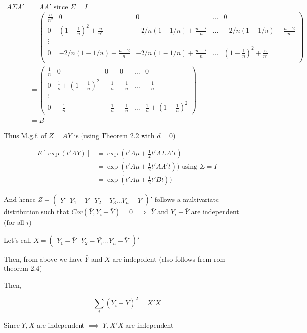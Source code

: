 \documentclass[a4paper]{article}
\begin{document}
\begin{align*}
A\Sigma A' &=  AA' \text{ since } \Sigma = I\\
&= \begin{pmatrix}
\frac{n}{n^2} & 0 & 0 & \dots & 0 \\
0 & (1-\frac{1}{n})^2+\frac{n}{n^2}  &  -2/n(1-1/n) + \frac{n-2}{n} & \dots & -2/n(1-1/n) + \frac{n-2}{n}\\
\vdots \\
0 & -2/n(1-1/n) + \frac{n-2}{n} & -2/n(1-1/n) + \frac{n-2}{n} & \dots & (1-\frac{1}{n})^2+\frac{n}{n^2}\\
\end{pmatrix}\\
&= \begin{pmatrix}
\frac{1}{n} & 0 & 0 & 0 & \dots & 0\\
0 & \frac{1}{n}+(1-\frac{1}{n})^2 & -\frac{1}{n} & -\frac{1}{n} &\dots & -\frac{1}{n}\\
\vdots\\
0 & -\frac{1}{n} & -\frac{1}{n} & -\frac{1}{n} & \dots & \frac{1}{n}+(1-\frac{1}{n})^2
\end{pmatrix}\\
&=B
\end{align*}


Thus M.g.f. of $Z=AY$ is (using Theorem 2.2 with $d=0$)

\begin{align*}
E[\exp(t'AY)] &= \exp(t'A\mu + \frac{1}{2}t'A\Sigma A't)\\
&= \exp(t'A\mu + \frac{1}{2}t'AA't)) \text{ using } \Sigma = I\\
&=\exp(t'A\mu + \frac{1}{2}t'Bt))
\end{align*}

And hence $Z=\begin{pmatrix} \bar{Y} & Y_1-\bar{Y}& Y_2-\bar{Y_3} \dots Y_n-\bar{Y}\end{pmatrix}'$ follows a multivariate distribution such that $Cov(\bar{Y}, Y_i-\bar{Y}) = 0$ $\implies$ $\bar{Y}$ and $Y_i-\bar{Y}$ are independent (for all $i$)

Let's call $X=\begin{pmatrix} Y_1-\bar{Y}& Y_2-\bar{Y_3} \dots Y_n-\bar{Y}\end{pmatrix}'$

Then, from above we have $\bar{Y}$ and $X$ are indepedent (also follows from rom theorem 2.4)

Then,

$$\sum_i(Y_i-\bar{Y})^2 = X'X$$

Since $\bar{Y},X$ are independent $\implies $ $\bar{Y},X'X$ are independent
\end{document}
